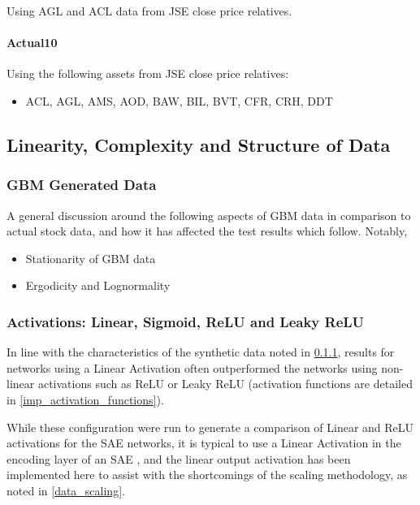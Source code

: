 \documentclass[a4paper,latin]{paper}
\begin{document}
Using AGL and ACL data from JSE close price relatives.

\paragraph{Actual10}\label{dataset_actual10}

Using the following assets from JSE close price relatives:

\begin{itemize}
	\item ACL, AGL, AMS, AOD, BAW, BIL, BVT, CFR, CRH, DDT
\end{itemize}

\subsection{Linearity, Complexity and Structure of Data}

\subsubsection{GBM Generated Data}\label{results_gbm_data}

A general discussion around the following aspects of GBM data in comparison to actual stock data, and how it has affected the test results which follow. Notably, 
\begin{itemize}
	\item Stationarity of GBM data
	\item Ergodicity and Lognormality 
\end{itemize}


\subsubsection{Activations: Linear, Sigmoid, ReLU and Leaky ReLU}

In line with the characteristics of the synthetic data noted in \ref{results_gbm_data}, results for networks using a Linear Activation often outperformed the networks using non-linear activations such as ReLU or Leaky ReLU (activation functions are detailed in \ref{imp_activation_functions}). \newline

While these configuration were run to generate a comparison of Linear and ReLU activations for the SAE networks, it is typical to use a Linear Activation in the encoding layer of an SAE \cite{Hinton2}, and the linear output activation has been implemented here to assist with the shortcomings of the scaling methodology, as noted in \ref{data_scaling}.\newline
\end{document}
